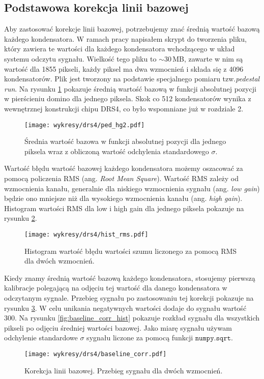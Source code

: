 \documentclass[a4paper,11pt,twoside]{article}
\begin{document}
\subsection{Podstawowa korekcja linii bazowej}
Aby zastosować korekcje linii bazowej, potrzebujemy znać średnią wartość bazową każdego kondensatora. W ramach pracy napisałem skrypt do tworzenia pliku, który zawiera te wartości dla każdego kondensatora wchodzącego w układ systemu odczytu sygnału. Wielkość tego pliku to $\sim 30$\,MB, zawarte w nim są wartość dla 1855 pikseli, każdy piksel ma dwa wzmocnień i składa się z 4096 kondensatorów. Plik jest tworzony na podstawie specjalnego pomiaru tzw.\textsl{pedestal run}. Na rysunku \ref{fig:ped_4096} pokazuje średnią wartość bazową w funkcji absolutnej pozycji w pierścieniu domino dla jednego piksela. Skok co 512 kondensatorów wynika z wewnętrznej konstrukcji chipu DRS4, co było wspomniane już w rozdziale 2.
\begin{figure}[H] 
\centering
\texttt{[image: wykresy/drs4/ped\_hg2.pdf]}
\caption{Średnia wartość bazowa w funkcji absolutnej pozycji dla jednego piksela wraz z obliczoną wartość odchylenia standardowego $\sigma$.}
\label{fig:ped_4096}
\end{figure}
Wartość błędu wartość bazowej każdego kondensatora możemy oszacować za pomocą policzenia RMS (ang. \textsl{Root Mean Square}). 
Wartość RMS zależy od wzmocnienia kanału, generalnie dla niskiego wzmocnienia sygnału (ang. \textsl{low gain}) będzie ono mniejsze niż dla wysokiego wzmocnienia kanału (ang. \textsl{high gain}). Histogram wartości RMS dla low i high gain dla jednego piksela pokazuje na rysunku \ref{fig:hist_rms}.
\begin{figure}[H] 
\centering
\texttt{[image: wykresy/drs4/hist\_rms.pdf]}
\caption{Histogram wartość błędu wartości szumu liczonego za pomocą RMS dla dwóch wzmocnień.}
\label{fig:hist_rms}
\end{figure}
\newpage
Kiedy znamy średnią wartość bazową każdego kondensatora, stosujemy pierwszą kalibracje polegającą na odjęciu tej wartość dla danego kondensatora w odczytanym sygnale. Przebieg sygnału po zastosowaniu tej korekcji pokazuje na rysunku \ref{fig:baseline_corr}. W celu unikania negatywnych wartości dodaje do sygnału wartość 300. Na rysunku \ref{fig:baseline_corr_hist} pokazuje rozkład sygnału dla wszystkich pikseli po odjęciu średniej wartości bazowej. Jako miarę sygnału używam odchylenie standardowe $\sigma$ sygnału liczone za pomocą funkcji $\mathtt{numpy.sqrt}$.
\begin{figure}[H] 
\centering
\texttt{[image: wykresy/drs4/baseline\_corr.pdf]}
\caption{Korekcja linii bazowej. Przebieg sygnału dla dwóch wzmocnień.}
\label{fig:baseline_corr}
\end{figure}
\end{document}

